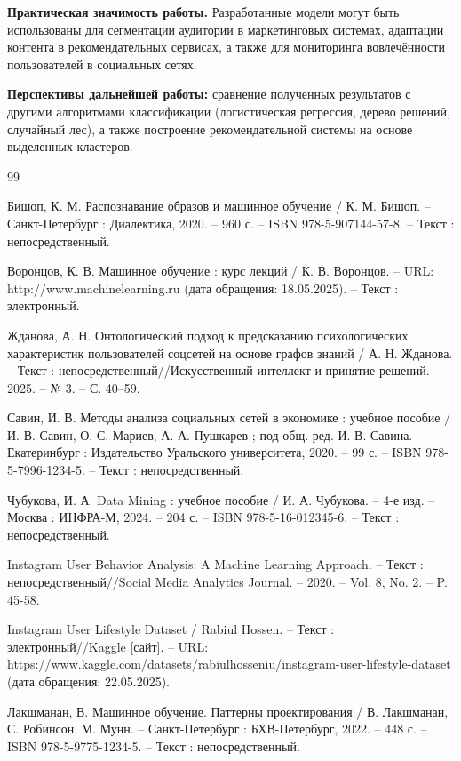 \documentclass[14pt, a4paper]{extarticle}
\begin{document}
\textbf{Практическая значимость работы.} Разработанные модели могут быть использованы для сегментации аудитории в маркетинговых системах, адаптации контента в рекомендательных сервисах, а также для мониторинга вовлечённости пользователей в социальных сетях.

\textbf{Перспективы дальнейшей работы:} сравнение полученных результатов с другими алгоритмами классификации (логистическая регрессия, дерево решений, случайный лес), а также построение рекомендательной системы на основе выделенных кластеров.

\newpage
\begin{thebibliography}{99}

Бишоп, К. М. Распознавание образов и машинное обучение / К. М. Бишоп. – Санкт-Петербург : Диалектика, 2020. – 960 с. – ISBN 978-5-907144-57-8. – Текст : непосредственный.

Воронцов, К. В. Машинное обучение : курс лекций / К. В. Воронцов. – URL: http://www.machinelearning.ru (дата обращения: 18.05.2025). – Текст : электронный.

Жданова, А. Н. Онтологический подход к предсказанию психологических характеристик пользователей соцсетей на основе графов знаний / А. Н. Жданова. – Текст : непосредственный//Искусственный интеллект и принятие решений. – 2025. – № 3. – С. 40–59.

Савин, И. В. Методы анализа социальных сетей в экономике : учебное пособие / И. В. Савин, О. С. Мариев, А. А. Пушкарев ; под общ. ред. И. В. Савина. – Екатеринбург : Издательство Уральского университета, 2020. – 99 с. – ISBN 978-5-7996-1234-5. – Текст : непосредственный.

Чубукова, И. А. Data Mining : учебное пособие / И. А. Чубукова. – 4-е изд. – Москва : ИНФРА-М, 2024. – 204 с. – ISBN 978-5-16-012345-6. – Текст : непосредственный.

Instagram User Behavior Analysis: A Machine Learning Approach. – Текст : непосредственный//Social Media Analytics Journal. – 2020. – Vol. 8, No. 2. – P. 45-58.

Instagram User Lifestyle Dataset / Rabiul Hossen. – Текст : электронный//Kaggle [сайт]. – URL: https://www.kaggle.com/datasets/rabiulhosseniu/instagram-user-lifestyle-dataset (дата обращения: 22.05.2025).

Лакшманан, В. Машинное обучение. Паттерны проектирования / В. Лакшманан, С. Робинсон, М. Мунн. – Санкт-Петербург : БХВ-Петербург, 2022. – 448 с. – ISBN 978-5-9775-1234-5. – Текст : непосредственный.


\end{thebibliography}
\end{document}
